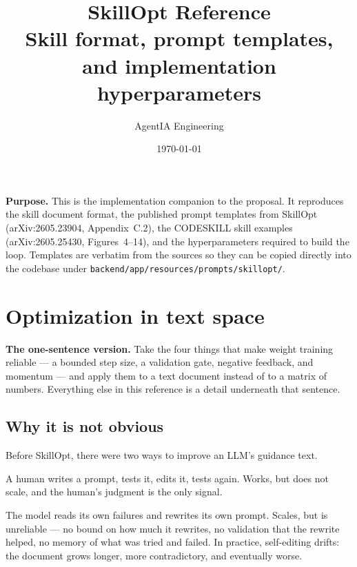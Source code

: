 \documentclass[11pt,a4paper]{article}
\title{\vspace{-2cm}\textbf{SkillOpt Reference}\\[0.2em]
\large Skill format, prompt templates, and implementation hyperparameters}
\author{AgentIA Engineering}
\date{\today}
\begin{document}
\maketitle
\thispagestyle{fancy}

\begin{keybox}
\textbf{Purpose.} This is the implementation companion to the proposal.
It reproduces the skill document format, the published prompt templates
from SkillOpt (arXiv:2605.23904, Appendix~C.2), the CODESKILL skill
examples (arXiv:2605.25430, Figures~4--14), and the hyperparameters
required to build the loop. Templates are verbatim from the sources so
they can be copied directly into the codebase under
\texttt{backend/app/resources/prompts/skillopt/}.
\end{keybox}

\tableofcontents
\newpage

\section{Optimization in text space}

\begin{keybox}
\textbf{The one-sentence version.} Take the four things that make weight
training reliable --- a bounded step size, a validation gate, negative
feedback, and momentum --- and apply them to a text document instead of
to a matrix of numbers. Everything else in this reference is a detail
underneath that sentence.
\end{keybox}

\subsection{Why it is not obvious}

Before SkillOpt, there were two ways to improve an LLM's guidance text.

\begin{description}[leftmargin=1.2em]
  \item[Hand-editing.] A human writes a prompt, tests it, edits it,
  tests again. Works, but does not scale, and the human's judgment is
  the only signal.
  \item[Self-editing.] The model reads its own failures and rewrites
  its own prompt. Scales, but is unreliable --- no bound on how much it
  rewrites, no validation that the rewrite helped, no memory of what
  was tried and failed. In practice, self-editing drifts: the document
  grows longer, more contradictory, and eventually worse.
\end{description}
\end{document}
